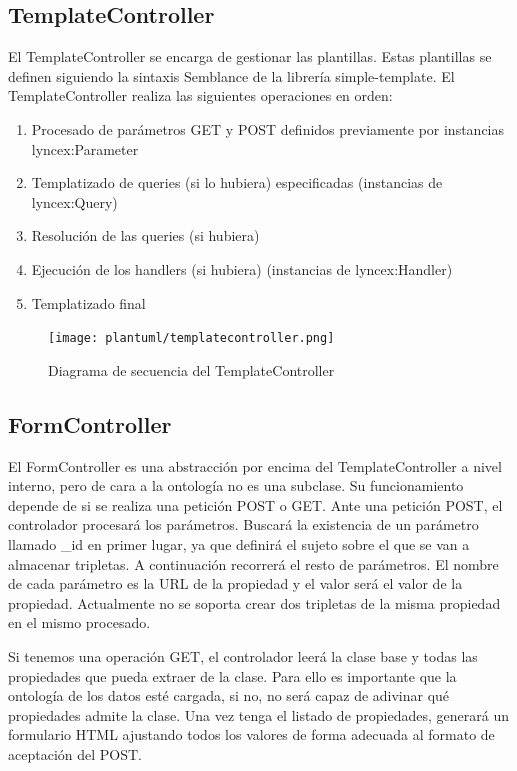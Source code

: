\documentclass[12pt]{report} %
\begin{document}
\subsection{TemplateController}
El TemplateController se encarga de gestionar las plantillas. Estas plantillas se definen siguiendo la sintaxis Semblance de la librería simple-template.
El TemplateController realiza las siguientes operaciones en orden:
\begin{enumerate}
    \item Procesado de parámetros GET y POST definidos previamente por instancias lyncex:Parameter
    \item Templatizado de queries (si lo hubiera) especificadas (instancias de lyncex:Query)
    \item Resolución de las queries (si hubiera)
    \item Ejecución de los handlers (si hubiera) (instancias de lyncex:Handler)
    \item Templatizado final
\end{enumerate}

\begin{figure}[h]
    \centering
    \texttt{[image: plantuml/templatecontroller.png]}
    \caption{Diagrama de secuencia del TemplateController}
    \label{fig:templatecontroller}
\end{figure}

\subsection{FormController}
El FormController es una abstracción por encima del TemplateController a nivel interno, pero de cara a la ontología no es una subclase.
Su funcionamiento depende de si se realiza una petición POST o GET. Ante una petición POST, el controlador procesará los parámetros.
Buscará la existencia de un parámetro llamado \_id en primer lugar, ya que definirá el sujeto sobre el que se van a almacenar tripletas.
A continuación recorrerá el resto de parámetros. El nombre de cada parámetro es la URL de la propiedad y el valor será el valor de la propiedad.
Actualmente no se soporta crear dos tripletas de la misma propiedad en el mismo procesado.

Si tenemos una operación GET, el controlador leerá la clase base y todas las propiedades que pueda extraer de la clase. Para ello es importante que la ontología de los datos esté cargada, si no, no será capaz de adivinar qué propiedades admite la clase.
Una vez tenga el listado de propiedades, generará un formulario HTML ajustando todos los valores de forma adecuada al formato de aceptación del POST.
\end{document}
